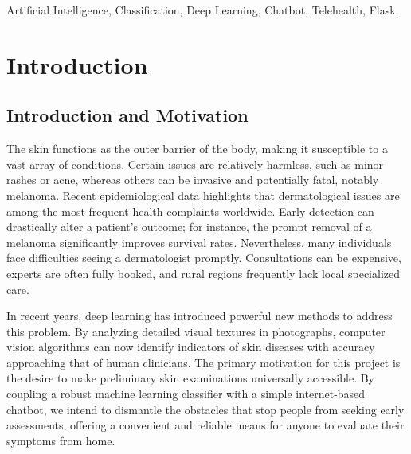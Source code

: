\documentclass[conference]{IEEEtran}
\begin{document}
\begin{IEEEkeywords}
Artificial Intelligence, Classification, Deep Learning, Chatbot, Telehealth, Flask.
\end{IEEEkeywords}

\section{Introduction}
\subsection{Introduction and Motivation}
The skin functions as the outer barrier of the body, making it susceptible to a vast array of conditions. Certain issues are relatively harmless, such as minor rashes or acne, whereas others can be invasive and potentially fatal, notably melanoma. Recent epidemiological data highlights that dermatological issues are among the most frequent health complaints worldwide. Early detection can drastically alter a patient’s outcome; for instance, the prompt removal of a melanoma significantly improves survival rates. Nevertheless, many individuals face difficulties seeing a dermatologist promptly. Consultations can be expensive, experts are often fully booked, and rural regions frequently lack local specialized care.

In recent years, deep learning has introduced powerful new methods to address this problem. By analyzing detailed visual textures in photographs, computer vision algorithms can now identify indicators of skin diseases with accuracy approaching that of human clinicians. The primary motivation for this project is the desire to make preliminary skin examinations universally accessible. By coupling a robust machine learning classifier with a simple internet-based chatbot, we intend to dismantle the obstacles that stop people from seeking early assessments, offering a convenient and reliable means for anyone to evaluate their symptoms from home.
\end{document}
